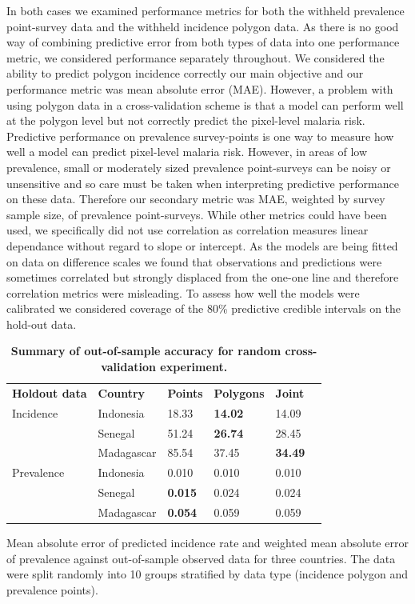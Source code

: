 \documentclass[10pt,letterpaper]{article}
\newlength\savedwidth
\newcommand\thickhline{\noalign{\global\savedwidth\arrayrulewidth\global\arrayrulewidth 2pt}%
\hline
\noalign{\global\arrayrulewidth\savedwidth}}
\begin{document}
In both cases we examined performance metrics for both the withheld prevalence point-survey data and the withheld incidence polygon data.
As there is no good way of combining predictive error from both types of data into one performance metric, we considered performance separately throughout.
We considered the ability to predict polygon incidence correctly our main objective and our performance metric was mean absolute error (MAE).
However, a problem with using polygon data in a cross-validation scheme is that a model can perform well at the polygon level but not correctly predict the pixel-level malaria risk.
Predictive performance on prevalence survey-points is one way to measure how well a model can predict pixel-level malaria risk.
However, in areas of low prevalence, small or moderately sized prevalence point-surveys can be noisy or unsensitive and so care must be taken when interpreting predictive performance on these data.
Therefore our secondary metric was MAE, weighted by survey sample size, of prevalence point-surveys.
While other metrics could have been used, we specifically did not use correlation as correlation measures linear dependance without regard to slope or intercept.
As the models are being fitted on data on difference scales we found that observations and predictions were sometimes correlated but strongly displaced from the one-one line and therefore correlation metrics were misleading.
To assess how well the models were calibrated we considered coverage of the 80\% predictive credible intervals on the hold-out data.




\begin{table}[!t]
\begin{adjustwidth}{-2.25in}{0in} %
\centering
\caption{
{\bf Summary of out-of-sample accuracy for random cross-validation experiment.}}
\begin{tabular}{llllll}
\hline
{\bf Holdout data} & {\bf Country} &  {\bf Points} & {\bf Polygons} & {\bf Joint} \\
\thickhline 
Incidence & Indonesia & 18.33 & {\bf 14.02} &  14.09\\
& Senegal & 51.24 & {\bf 26.74} &  28.45\\
& Madagascar & 85.54 & 37.45 &  {\bf 34.49}\vspace{3mm}\\
Prevalence & Indonesia & 0.010 & 0.010 &  0.010\\
& Senegal & {\bf 0.015} & 0.024 &  0.024\\
& Madagascar & {\bf 0.054} & 0.059 &  0.059\\
\end{tabular}
\begin{flushleft}
Mean absolute error of predicted incidence rate and weighted mean absolute error of prevalence against out-of-sample observed data for three countries.
The data were split randomly into 10 groups stratified by data type (incidence polygon and prevalence points).
\end{flushleft}
\label{table1}
\end{adjustwidth}
\end{table}
\end{document}
